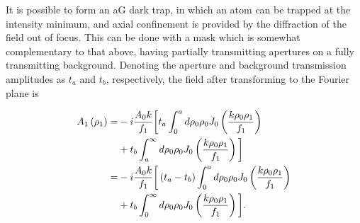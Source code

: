 It is possible to form an aG dark trap, in which an atom can be trapped at the intensity minimum, and axial confinement is provided by the diffraction of the field out of focus. This can be done with a mask which is somewhat complementary to that above, having partially transmitting apertures on a fully transmitting background. Denoting the aperture and background transmission amplitudes as $t_a$ and $t_b$, respectively, the field after transforming to the Fourier plane is

\begin{equation}
    \begin{aligned}
        \phantom{A_{1}\left(\rho_{1}\right)}
        &\begin{aligned}
            \mathllap{A_{1}\left(\rho_{1}\right)} =&-i \frac{A_{0} k}{f_{1}}\bigg[t_{a} \int_{0}^{a} d \rho_{0} \rho_{0} J_{0}\left(\frac{k \rho_{0} \rho_{1}}{f_{1}}\right) \\
            &+t_{b} \int_{a}^{\infty} d \rho_{0} \rho_{0} J_{0}\left(\frac{k \rho_{0} \rho_{1}}{f_{1}}\right)\bigg]
        \end{aligned} \\
        &\begin{aligned}
            \mathllap{{}}=&-i \frac{A_{0} k}{f_{1}}\bigg[\left(t_{a}-t_{b}\right) \int_{0}^{a} d \rho_{0} \rho_{0} J_{0}\left(\frac{k \rho_{0} \rho_{1}}{f_{1}}\right) \\
            &+t_{b} \int_{0}^{\infty} d \rho_{0} \rho_{0} J_{0}\left(\frac{k \rho_{0} \rho_{1}}{f_{1}}\right)\bigg].
        \end{aligned}
    \end{aligned}
\end{equation}

